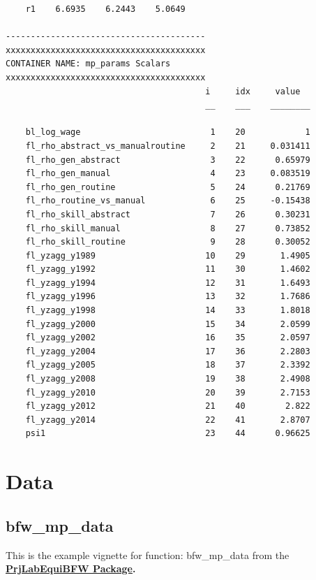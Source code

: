 \documentclass[
]{book}
\begin{document}
\begin{verbatim}
    r1    6.6935    6.2443    5.0649

----------------------------------------
xxxxxxxxxxxxxxxxxxxxxxxxxxxxxxxxxxxxxxxx
CONTAINER NAME: mp_params Scalars
xxxxxxxxxxxxxxxxxxxxxxxxxxxxxxxxxxxxxxxx
                                        i     idx     value  
                                        __    ___    ________

    bl_log_wage                          1    20            1
    fl_rho_abstract_vs_manualroutine     2    21     0.031411
    fl_rho_gen_abstract                  3    22      0.65979
    fl_rho_gen_manual                    4    23     0.083519
    fl_rho_gen_routine                   5    24      0.21769
    fl_rho_routine_vs_manual             6    25     -0.15438
    fl_rho_skill_abstract                7    26      0.30231
    fl_rho_skill_manual                  8    27      0.73852
    fl_rho_skill_routine                 9    28      0.30052
    fl_yzagg_y1989                      10    29       1.4905
    fl_yzagg_y1992                      11    30       1.4602
    fl_yzagg_y1994                      12    31       1.6493
    fl_yzagg_y1996                      13    32       1.7686
    fl_yzagg_y1998                      14    33       1.8018
    fl_yzagg_y2000                      15    34       2.0599
    fl_yzagg_y2002                      16    35       2.0597
    fl_yzagg_y2004                      17    36       2.2803
    fl_yzagg_y2005                      18    37       2.3392
    fl_yzagg_y2008                      19    38       2.4908
    fl_yzagg_y2010                      20    39       2.7153
    fl_yzagg_y2012                      21    40        2.822
    fl_yzagg_y2014                      22    41       2.8707
    psi1                                23    44      0.96625
\end{verbatim}

\hypertarget{data}{%
\chapter{Data}\label{data}}

\hypertarget{bfw_mp_data}{%
\section{bfw\_mp\_data}\label{bfw_mp_data}}

This is the example vignette for function: bfw\_mp\_data from the
\href{https://fanwangecon.github.io/PrjLabEquiBFW/}{\textbf{PrjLabEquiBFW
Package}}\textbf{.}
\end{document}
